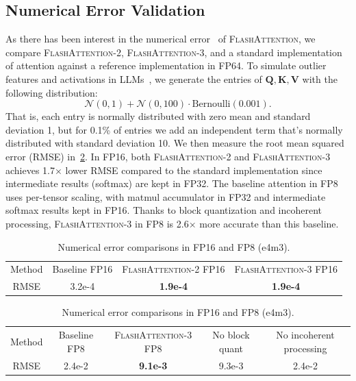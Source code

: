 \documentclass{article}
\newcommand{\vQ}{\mathbf{Q}}
\newcommand{\vK}{\mathbf{K}}
\newcommand{\vV}{\mathbf{V}}
\newcommand{\fa}{\textsc{FlashAttention}\xspace}
\newcommand{\faa}{\textsc{FlashAttention-2}\xspace}
\newcommand{\fat}{\textsc{FlashAttention-3}\xspace}  %
\begin{document}
\subsection{Numerical Error Validation}
\label{sec:numerical_error}

As there has been interest in the numerical error~\citep{golden2024flash} of
\fa, we compare \faa, \fat, and a standard implementation of attention against a
reference implementation in FP64.
To simulate outlier features and activations in LLMs~\citep{dettmers2208llm,
  sun2024massive}, we generate the entries of $\vQ, \vK, \vV$ with the following
distribution:
\begin{equation*}
  \mathcal{N}(0, 1) + \mathcal{N}(0, 100) \cdot \mathrm{Bernoulli}(0.001).
\end{equation*}
That is, each entry is normally distributed with zero mean and standard
deviation 1, but for 0.1\% of entries we add an independent term that's normally distributed
with standard deviation 10.
We then measure the root mean squared error (RMSE) in~\cref{table:numerical_error}.
In FP16, both \faa and \fat achieves 1.7$\times$ lower RMSE compared to the standard implementation since intermediate results (softmax) are kept in FP32.
The baseline attention in FP8 uses per-tensor scaling, with matmul accumulator in FP32 and intermediate softmax results kept in FP16.
Thanks to block quantization and incoherent processing, \fat in FP8 is 2.6$\times$ more accurate than this baseline.
\begin{table}[h!]
  \centering
  \caption{Numerical error comparisons in FP16 and FP8 (e4m3).}
  \label{table:numerical_error}
  \begin{tabular}{|c|ccc|}
      \hline
      Method & Baseline FP16 & \faa FP16 & \fat FP16 \\
      RMSE & 3.2e-4 & \textbf{1.9e-4} & \textbf{1.9e-4} \\
      \hline
  \end{tabular}
  \vspace{1em}
  \begin{tabular}{|c|cccc|}
      \hline
      Method & Baseline FP8 & \fat FP8 & No block quant & No incoherent processing \\
      RMSE & 2.4e-2 & \textbf{9.1e-3} & 9.3e-3 & 2.4e-2 \\
      \hline
  \end{tabular}
\end{table}
\end{document}
